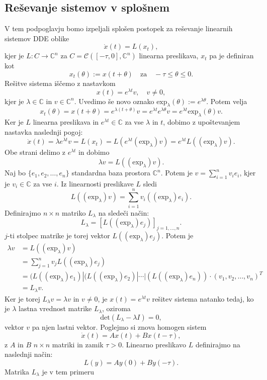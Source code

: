 \documentclass[12pt,a4paper]{amsart}
\theoremstyle{definition} %
\theoremstyle{plain} %
\newcommand{\C}{\mathbb C}
\newcommand{\okr}{\text{exp}_{\lambda}}
\begin{document}
\subsection{Reševanje sistemov v splošnem}
V tem podpoglavju bomo izpeljali splošen postopek za reševanje linearnih sistemov DDE oblike 
\[\dot{x}(t)=L(x_t),\]
kjer je $L:C\to\C^n$ za $C=\mathcal{C}([-\tau,0],\C^n)$ linearna preslikava, $x_t$ pa je definiran kot 
\[x_t(\theta):=x(t+\theta) \quad \text{za} \quad -\tau\leq\theta\leq0.\]
Rešitve sistema iščemo z nastavkom 
\[x(t)=e^{\lambda t}v, \quad v\neq0,\]
kjer je $\lambda\in\C$ in  $v\in\C^n$. Uvedimo še novo oznako $\text{exp}_{\lambda}(\theta):=e^{\lambda\theta}$.
Potem velja
\[x_t(\theta)=x(t+\theta)=e^{\lambda(t+\theta)}v=e^{\lambda t}e^{\lambda\theta}v=e^{\lambda t}\text{exp}_{\lambda}(\theta)v.\]
Ker je $L$ linearna preslikava in $e^{\lambda t}\in\C$ za vse $\lambda$ in $t$, dobimo z upoštevanjem nastavka naslednji
pogoj:
\[\dot{x}(t)=\lambda e^{\lambda t}v=L(x_t)=L(e^{\lambda t}(\text{exp}_{\lambda})v)=e^{\lambda t}L((\text{exp}_{\lambda})v).\]
Obe strani delimo z $e^{\lambda t}$ in dobimo 
\[ \lambda v=L((\okr)v).\]
Naj bo $\{e_1,e_2,\dots,e_n\}$ standardna baza prostora $\C^n$. Potem je 
$v=\sum_{i=1}^nv_ie_i$, kjer je $v_i\in\C$ za vse $i$. Iz linearnosti preslikave $L$ sledi 
\[L((\okr)v)=\sum_{i=1}^{n}v_i((\okr)e_i).\]
Definirajmo $n\times n$ matriko $L_\lambda$ na sledeči način:
\[ L_{\lambda}=[L((\okr)e_j)]_{j=1,\dots,n}.\]
$j$-ti stolpec matrike je torej vektor $L((\okr)e_j)$. Potem je
\begin{equation*}
    \begin{split}
        \lambda v &= L((\okr)v) \\
                &= \sum_{j=1}^{n}v_jL((\okr)e_j) \\
                &= (L((\okr)e_1)|(L((\okr)e_2)|\cdots|(L((\okr)e_n)) \cdot (v_1,v_2,\dots,v_n)^{T} \\
                &= L_{\lambda}v.
    \end{split}
\end{equation*}
Ker je torej $L_\lambda v =\lambda v$ in $v\neq0$, je $x(t)=e^{\lambda t}v$ rešitev sistema natanko tedaj, ko je
$\lambda$ lastna vrednost matrike $L_\lambda$, oziroma
\[ \text{det}(L_\lambda-\lambda I)=0,\]
vektor $v$ pa njen lastni vektor.
Poglejmo si znova homogen sistem 
\[ \dot{x}(t)=Ax(t)+Bx(t-\tau),\]
z $A$ in $B$ $n\times n$ matriki in zamik $\tau>0$. Linearno preslikavo $L$ definirajmo na naslednji način:
\[L(y)=Ay(0)+By(-\tau).\]
Matrika $L_\lambda$ je v tem primeru
\end{document}
